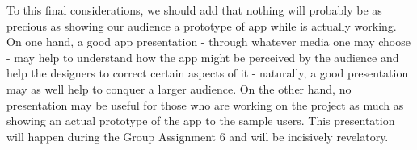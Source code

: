 \documentclass[12pt]{scrartcl}
\begin{document}
	To this final considerations, we should add that nothing will probably be as precious as showing our audience a prototype of app while is actually working. On one hand, a good app presentation - through whatever media one may choose - may help to understand how the app might be perceived by the audience and help the designers to correct certain aspects of it - naturally, a good presentation may as well help to conquer a larger audience. On the other hand, no presentation may be useful for those who are working on the project as much as showing an actual prototype of the app to the sample users. This presentation will happen during the Group Assignment 6 and will be incisively revelatory. 
\end{document}

